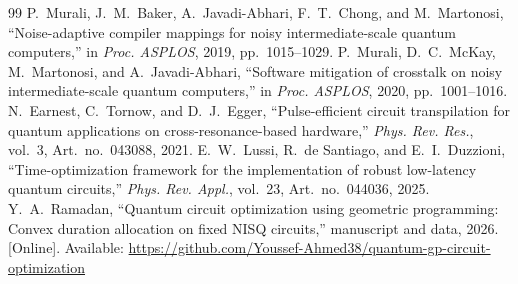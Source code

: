 \documentclass[10pt,journal]{IEEEtran}
\theoremstyle{remark}
\begin{document}
\begin{thebibliography}{99}
 P.~Murali, J.~M.~Baker, A.~Javadi-Abhari, F.~T.~Chong, and M.~Martonosi, ``Noise-adaptive compiler mappings for noisy intermediate-scale quantum computers,'' in \emph{Proc. ASPLOS}, 2019, pp.~1015--1029.
 P.~Murali, D.~C.~McKay, M.~Martonosi, and A.~Javadi-Abhari, ``Software mitigation of crosstalk on noisy intermediate-scale quantum computers,'' in \emph{Proc. ASPLOS}, 2020, pp.~1001--1016.
 N.~Earnest, C.~Tornow, and D.~J.~Egger, ``Pulse-efficient circuit transpilation for quantum applications on cross-resonance-based hardware,'' \emph{Phys. Rev. Res.}, vol.~3, Art.~no.~043088, 2021.
 E.~W.~Lussi, R.~de Santiago, and E.~I.~Duzzioni, ``Time-optimization framework for the implementation of robust low-latency quantum circuits,'' \emph{Phys. Rev. Appl.}, vol.~23, Art.~no.~044036, 2025.
 Y.~A.~Ramadan, ``Quantum circuit optimization using geometric programming: Convex duration allocation on fixed NISQ circuits,'' manuscript and data, 2026. [Online]. Available: \url{https://github.com/Youssef-Ahmed38/quantum-gp-circuit-optimization}
\end{thebibliography}
\end{document}
